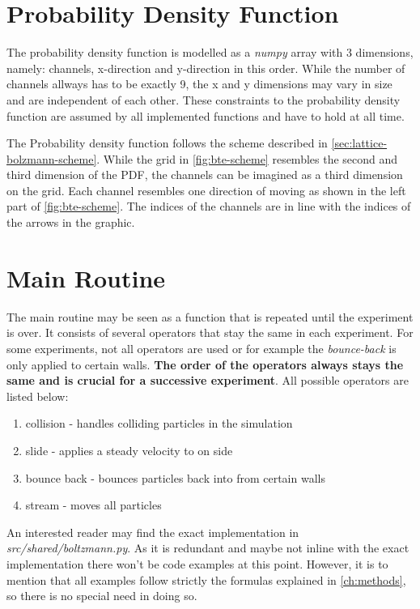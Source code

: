 \section{Probability Density Function}
The probability density function is modelled as a \textit{numpy} array with 3 dimensions, namely: channels, x-direction and y-direction in this order.
While the number of channels allways has to be exactly 9, the x and y dimensions may vary in size and are independent of each other.
These constraints to the probability density function are assumed by all implemented functions and have to hold at all time.
\newline

The Probability density function follows the scheme described in \cref{sec:lattice-bolzmann-scheme}.
While the grid in \cref{fig:bte-scheme} resembles the second and third dimension of the PDF, the channels can be imagined as a third dimension on the grid.
Each channel resembles one direction of moving as shown in the left part of \cref{fig:bte-scheme}.
The indices of the channels are in line with the indices of the arrows in the graphic.


\section{Main Routine}
The main routine may be seen as a function that is repeated until the experiment is over.
It consists of several operators that stay the same in each experiment.
For some experiments, not all operators are used or for example the \textit{bounce-back} is only applied to certain walls.
\textbf{The order of the operators always stays the same and is crucial for a successive experiment}.
All possible operators are listed below:
\begin{enumerate}
    \item collision - handles colliding particles in the simulation
    \item slide - applies a steady velocity to on side
    \item bounce back - bounces particles back into from certain walls
    \item stream - moves all particles
\end{enumerate}

An interested reader may find the exact implementation in \textit{src/shared/boltzmann.py}.
As it is redundant and maybe not inline with the exact implementation there won't be code examples at this point.
However, it is to mention that all examples follow strictly the formulas explained in \cref{ch:methods}, so there is no special need in doing so.
